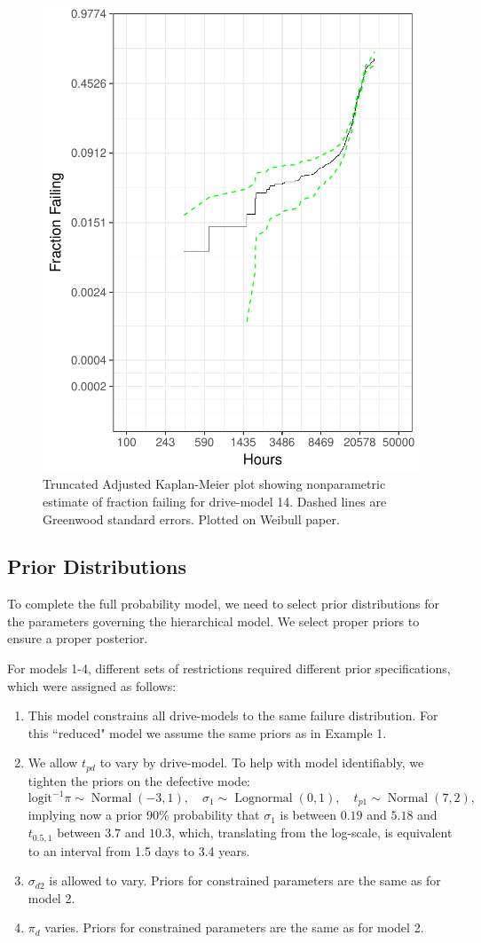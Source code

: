 \documentclass[12pt]{article}
\newcommand{\op}{\operatorname}
\begin{document}
\begin{figure}[H]
\centering
\includegraphics[width=.5\textwidth]{fig/mod14-KM-adj}
\caption{Truncated Adjusted Kaplan-Meier plot showing nonparametric estimate of fraction failing for drive-model 14.  Dashed lines are Greenwood standard errors.  Plotted on Weibull paper.}
\end{figure}


\subsection{Prior Distributions}
\label{sec:Prior Distributions}
To complete the full probability model, we need to select prior distributions for the parameters governing the hierarchical model. We select proper priors to ensure a proper posterior.

For models 1-4, different sets of restrictions required different prior specifications, which were assigned as follows:

\begin{enumerate}
\item This model constrains all drive-models to the same failure distribution. For this ``reduced" model we assume the same priors as in Example 1.

\item We allow $t_{pd}$ to vary by drive-model. To help with model identifiably, we tighten the priors on the defective mode:
$$ \mbox{logit}^{-1}\pi \sim \op{Normal}(-3,1),\quad \sigma_1 \sim \op{Lognormal}(0, 1), \quad t_{p1} \sim \op{Normal}(7,2),$$
implying now a prior $90\%$ probability that $\sigma_1$ is between $0.19$ and $5.18$ and $t_{0.5,1}$ between $3.7$ and $10.3$, which, translating from the log-scale, is equivalent to an interval from 1.5 days to 3.4 years.

\item $\sigma_{d2}$ is allowed to vary. Priors for constrained parameters are the same as for model 2.

\item $\pi_d$ varies. Priors for constrained parameters are the same as for model 2.

\end{enumerate}
\end{document}
